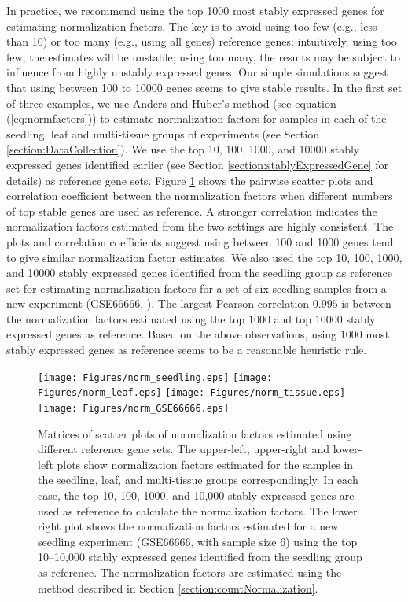 \documentclass[letterpaper,12pt]{article}
\begin{document}
In practice, we recommend using the top 1000 most stably expressed genes for
estimating normalization factors. The key is to avoid using too few (e.g.,
less than 10) or too many (e.g., using all genes) reference genes:
intuitively, using too few, the estimates will be unstable; using too many,
the results may be subject to influence from highly unstably expressed genes.
Our simple simulations suggest that using between 100 to 10000 genes seems to
give stable results. In the first set of three examples, we use Anders and
Huber's method (see equation (\ref{eq:normfactors})) to estimate normalization
factors for samples in each of the seedling, leaf and multi-tissue groups of
experiments (see Section \ref{section:DataCollection}).  We use the top 10,
100, 1000, and 10000 stably expressed genes identified earlier (see Section
\ref{section:stablyExpressedGene} for details) as reference gene sets. Figure
\ref{fig:normfactor} shows the pairwise scatter plots and correlation
coefficient between the normalization factors when different numbers of top
stable genes are used as reference. A stronger correlation indicates the
normalization factors estimated from the two settings are highly consistent.
The plots and correlation coefficients suggest using between 100 and 1000
genes tend to give similar normalization factor estimates. We also used the
top 10, 100, 1000, and 10000 stably expressed genes identified from the
seedling group as reference set for estimating normalization factors for a set
of six seedling samples from a new experiment (GSE66666, \cite{capella2015arabidopsis}). The largest Pearson correlation
$0.995$ is between the normalization factors estimated using the top $1000$
and top $10000$ stably expressed genes as reference. Based on the above
observations, using 1000 most stably expressed genes as reference seems to be
a reasonable heuristic rule.




\begin{figure}[!ht]
	\begin{center}
		\texttt{[image: Figures/norm\_seedling.eps]}
		\texttt{[image: Figures/norm\_leaf.eps]}
		\texttt{[image: Figures/norm\_tissue.eps]}
		\texttt{[image: Figures/norm\_GSE66666.eps]}
		\caption{Matrices of scatter plots of normalization factors
		estimated using different reference gene sets. 
		The upper-left, upper-right and lower-left plots show
		normalization factors estimated for the samples in the
		seedling, leaf, and multi-tissue groups correspondingly. 
		In each case, the top 10, 100, 1000, and 10,000 stably
		expressed genes are used as reference to
		calculate the normalization factors.
		The lower right plot shows the normalization factors estimated for a new seedling
		experiment (GSE66666, with sample size 6) using the top 10--10,000
		stably expressed genes identified from the seedling group as
		reference. The normalization factors are estimated using the
		method described in Section \ref{section:countNormalization}.}
		\label{fig:normfactor} \end{center} \end{figure}
\end{document}
